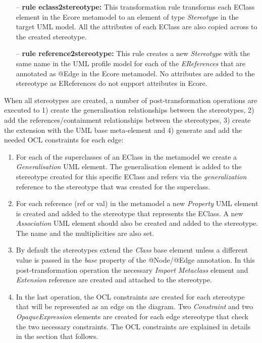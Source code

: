 \begin{itemize}
	\item[--] \textbf{rule eclass2stereotype:} This transformation rule transforms each EClass element in the Ecore metamodel to an element of type \textit{Stereotype} in the target UML model. All the attributes of each EClass are also copied across to the created stereotype.  
	\item[--] \textbf{rule reference2stereotype:} This rule creates a new \textit{Stereotype} with the same name in the UML profile model for each of the \textit{EReferences} that are annotated as @Edge in the Ecore metamodel. No attributes are added to the stereotype as EReferences do not support attributes in Ecore. 
\end{itemize}

When all stereotypes are created, a number of post-transformation operations are executed to 1) create the generalisation relationships between the 
stereotypes, 2) add the references/containment relationships between the stereotypes, 3) create the extension with the UML base meta-element and 4) 
generate and add the needed OCL constraints for each edge: 

\begin{enumerate}[label=\arabic*)]
	\item For each of the superclasses of an EClass in the metamodel we create a \textit{Generalisation} UML element. 
	The generalisation element is added to the stereotype created for this specific EClass and refers via the \textit{generalization} reference to the stereotype that was created for the superclass.
	\item For each reference (ref or val) in the metamodel a new \textit{Property} UML element is created and added to the stereotype that 
	represents the EClass. 
	A new \textit{Association} UML element should also be created and added to the stereotype. The name and the multiplicities are also set.
	\item By default the stereotypes extend the \textit{Class} base element unless a different value is passed in the \textit{base} property of the @Node/@Edge annotation. 
	In this post-transformation operation the necessary \textit{Import Metaclass} element and \textit{Extension} reference are created and attached to the stereotype.
	\item In the last operation,  the OCL constraints are created for each stereotype that will be represented as an edge on the diagram. 
	Two \textit{Constraint} and two \textit{OpaqueExpression} elements are created for each edge stereotype that check the two necessary constraints. 
	The OCL constraints are explained in details in the section that follows.
\end{enumerate}

